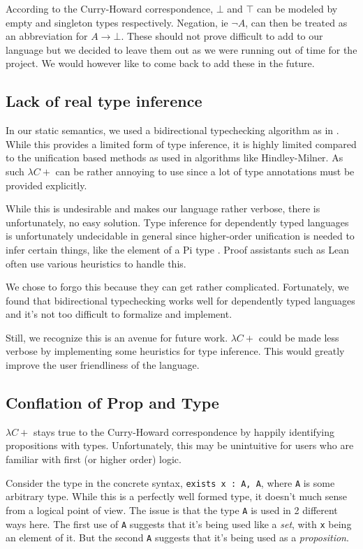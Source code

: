 \documentclass{article}
\begin{document}
According to the Curry-Howard correspondence, $\bot$ and $\top$ can be modeled
by empty and singleton types respectively. 
Negation, ie $\neg A$, can then be treated as an abbreviation for
$A \rightarrow \bot$.
These should not prove difficult to add to our language but we decided to leave
them out as we were running out of time for the project.
We would however like to come back to add these in the future.

\subsection{Lack of real type inference}
In our static semantics, we used a bidirectional typechecking algorithm
as in \cite{lambdapi}. While this provides a limited form of type inference,
it is highly limited compared to the unification based methods as used in algorithms
like Hindley-Milner.
As such $\lambda C+$ can be rather annoying to use since a lot of type annotations
must be provided explicitly.

While this is undesirable and makes our language rather verbose, there is
unfortunately, no easy solution.
Type inference for dependently typed languages is unfortunately undecidable in
general \cite{undecidable_type_infer} since higher-order unification is needed
to infer certain things, like the element of a Pi type \cite{elab_in_dtt}.
Proof assistants such as Lean often use various heuristics \cite{elab_in_dtt}
to handle this.

We chose to forgo this because they can get rather complicated. Fortunately,
we found that bidirectional typechecking works well for dependently typed
languages and it's not too difficult to formalize and implement.

Still, we recognize this is an avenue for future work.
$\lambda C+$ could be made less verbose by implementing some heuristics for type 
inference. This would greatly improve the user friendliness of the language.

\subsection{Conflation of Prop and Type}
$\lambda C+$ stays true to the Curry-Howard correspondence by happily identifying
propositions with types.
Unfortunately, this may be unintuitive for users who are familiar with first
(or higher order) logic.

Consider the type in the concrete syntax, \verb|exists x : A, A|, where \texttt{A}
is some arbitrary type.
While this is a perfectly well formed type, it doesn't much sense from a
logical point of view.
The issue is that the type \texttt{A} is used in 2 different ways here.
The first use of \texttt{A} suggests that it's being used like a \textit{set}, with
\texttt{x} being an element of it. But the second \texttt{A} suggests that it's
being used as a \textit{proposition}.
\end{document}
